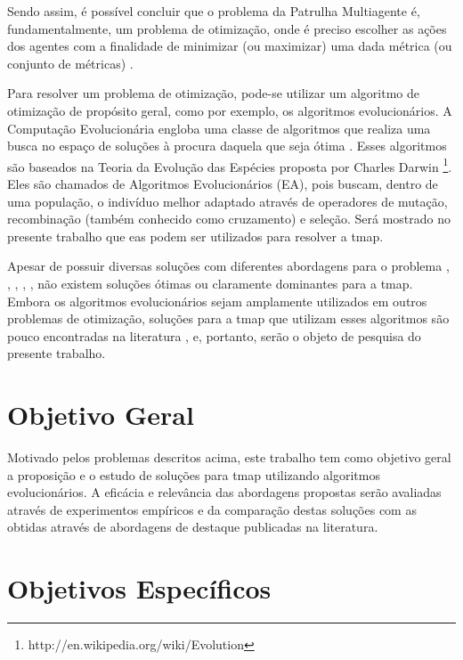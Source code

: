 Sendo assim, é possível concluir que o problema da Patrulha Multiagente é, 
fundamentalmente, um problema de otimização, onde é preciso escolher as ações 
dos agentes com a finalidade de minimizar (ou maximizar) uma dada métrica 
(ou conjunto de métricas) \citep{sampaiophd}.

Para resolver um problema de otimização, pode-se utilizar um algoritmo de 
otimização de propósito geral, como por exemplo, os algoritmos evolucionários. 
A Computação Evolucionária engloba uma classe de algoritmos que realiza uma 
busca no espaço de soluções à procura daquela que seja ótima 
\citep{Luke2013Metaheuristics}. Esses algoritmos são baseados na Teoria da 
Evolução das Espécies proposta por Charles Darwin 
\footnote{http://en.wikipedia.org/wiki/Evolution}. Eles são chamados de 
Algoritmos Evolucionários (EA), pois buscam, dentro de uma população, 
o indivíduo melhor adaptado através de operadores de mutação, recombinação 
(também conhecido como cruzamento) e seleção. Será mostrado no presente trabalho 
que \acp{ea} podem ser utilizados para resolver a \ac{tmap}.

Apesar de possuir diversas soluções com diferentes abordagens para o problema 
\citep{Chevaleyre:2004:TAM:1018411.1019013}, 
\citep{Machado:2002:MPE:1765317.1765332}, \citep{Almeida:2004:AAI}, 
\citep{4209122}, \citep{hernandez2013game}, não existem soluções ótimas ou 
claramente dominantes para a \ac{tmap}. Embora os algoritmos evolucionários 
sejam amplamente utilizados em outros problemas de otimização, soluções para a 
\ac{tmap} que utilizam esses algoritmos são pouco encontradas na 
literatura \citep{4630897}, \citep{6900280} e, portanto, serão o objeto de 
pesquisa do presente trabalho.

\section{Objetivo Geral}

Motivado pelos problemas descritos acima, este trabalho tem como objetivo geral 
a proposição e o estudo de soluções para \ac{tmap} utilizando algoritmos 
evolucionários. A eficácia e relevância das abordagens propostas serão avaliadas 
através de experimentos empíricos e da comparação destas soluções com as obtidas 
através de abordagens de destaque publicadas na literatura.

\section{Objetivos Específicos}

